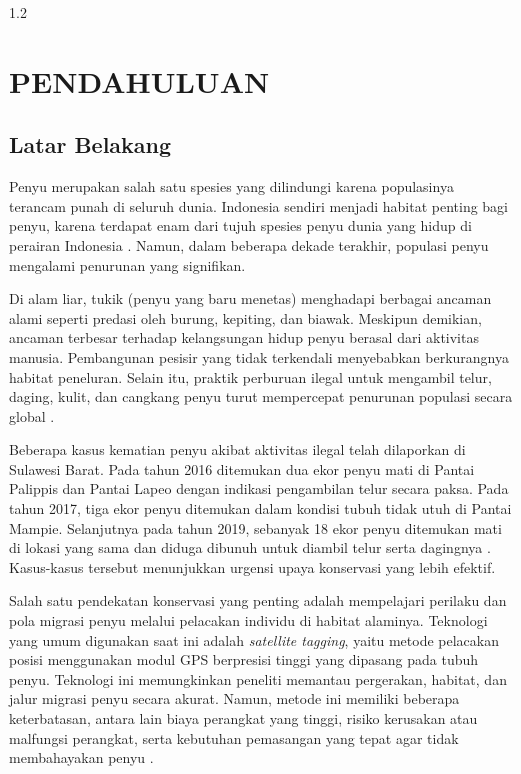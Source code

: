 
\begin{spacing}{1.2}
      \chapter{PENDAHULUAN}
\end{spacing}


\vspace{4ex}

\section{Latar Belakang}
Penyu merupakan salah satu spesies yang dilindungi karena populasinya terancam punah di seluruh dunia.
Indonesia sendiri menjadi habitat penting bagi penyu, karena terdapat enam dari tujuh spesies penyu dunia yang hidup di perairan Indonesia \cite{JKT602}.
Namun, dalam beberapa dekade terakhir, populasi penyu mengalami penurunan yang signifikan.

Di alam liar, tukik (penyu yang baru menetas) menghadapi berbagai ancaman alami seperti predasi oleh burung, kepiting, dan biawak.
Meskipun demikian, ancaman terbesar terhadap kelangsungan hidup penyu berasal dari aktivitas manusia.
Pembangunan pesisir yang tidak terkendali menyebabkan berkurangnya habitat peneluran.
Selain itu, praktik perburuan ilegal untuk mengambil telur, daging, kulit, dan cangkang penyu turut mempercepat penurunan populasi secara global \cite{JKT602}.

Beberapa kasus kematian penyu akibat aktivitas ilegal telah dilaporkan di Sulawesi Barat.
Pada tahun 2016 ditemukan dua ekor penyu mati di Pantai Palippis dan Pantai Lapeo dengan indikasi pengambilan telur secara paksa.
Pada tahun 2017, tiga ekor penyu ditemukan dalam kondisi tubuh tidak utuh di Pantai Mampie.
Selanjutnya pada tahun 2019, sebanyak 18 ekor penyu ditemukan mati di lokasi yang sama dan diduga dibunuh untuk diambil telur serta dagingnya \cite{nur2022pelatihan}.
Kasus-kasus tersebut menunjukkan urgensi upaya konservasi yang lebih efektif.

Salah satu pendekatan konservasi yang penting adalah mempelajari perilaku dan pola migrasi penyu melalui pelacakan individu di habitat alaminya.
Teknologi yang umum digunakan saat ini adalah \textit{satellite tagging}, yaitu metode pelacakan posisi menggunakan modul GPS berpresisi tinggi yang dipasang pada tubuh penyu.
Teknologi ini memungkinkan peneliti memantau pergerakan, habitat, dan jalur migrasi penyu secara akurat.
Namun, metode ini memiliki beberapa keterbatasan, antara lain biaya perangkat yang tinggi, risiko kerusakan atau malfungsi perangkat, serta kebutuhan pemasangan yang tepat agar tidak membahayakan penyu \cite{10.3389/fmars.2018.00432}.

